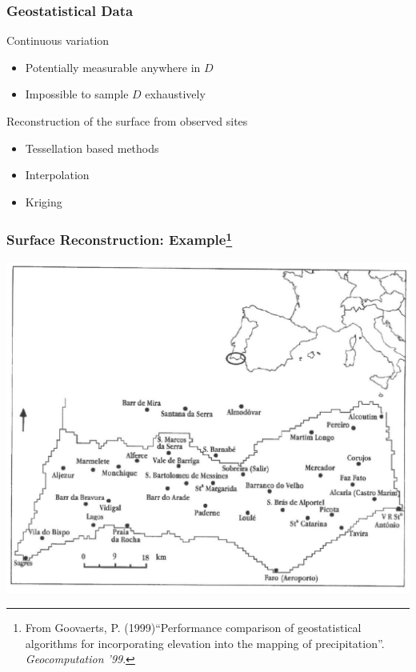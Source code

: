 \documentclass[nototal,handout]{beamer}
\begin{document}
 \begin{frame}[<+->]
   \frametitle{Geostatistical Data}
   \begin{block}{Continuous variation}
     \begin{itemize}
       \item Potentially measurable anywhere in $D$
       \item Impossible to sample $D$ exhaustively
     \end{itemize}
    \end{block}
\begin{block}{Reconstruction of the surface from observed sites}
     \begin{itemize}
       \item Tessellation based methods
       \item Interpolation
       \item Kriging
     \end{itemize}
    \end{block}
  \end{frame}
  \begin{frame}
    \frametitle{Surface Reconstruction: Example\footnote{From Goovaerts, P.
    (1999)``Performance comparison of geostatistical algorithms for
    incorporating elevation into the mapping of precipitation''.
    \emph{Geocomputation '99}.}}
    \begin{center}
      \includegraphics[width=.65\linewidth]{pg1.jpg}
    \end{center}
  \end{frame}
\end{document}
